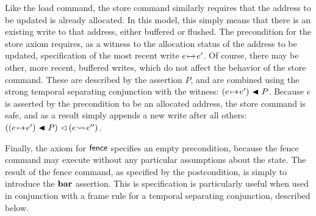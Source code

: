 \documentclass[11pt]{report}
\begin{document}
Like the load command, the store command similarly requires that the address to be updated is already allocated. In this model, this simply means that there is an existing write to that address, either buffered or flushed. The precondition for the store axiom requires, as a witness to the allocation status of the address to be updated, specification of the most recent write $e \!\mapsto\! e'$. Of course, there may be other, more recent, buffered writes, which do not affect the behavior of the store command. These are described by the assertion $P$, and are combined using the strong temporal separating conjunction with the witness: $(e \!\mapsto\! e') \operatorname{\,\blacktriangleleft\,} P$. Because $e$ is asserted by the precondition to be an allocated address, the store command is safe, and as a result simply appends a new write after all others: $((e \!\mapsto\! e') \operatorname{\,\blacktriangleleft\,} P) \operatorname{\,\vartriangleleft\,} (e \!\leadsto\! e'')$. 


Finally, the axiom for $\operatorname{\mathsf{fence}}$ specifies an empty precondition, because the fence command may execute without any particular assumptions about the state. The result of the fence command, as specified by the postcondition, is simply to introduce the $\mathbf{bar}$ assertion. This is specification is particularly useful when used in conjunction with a frame rule for a temporal separating conjunction, described below. 
\end{document}
